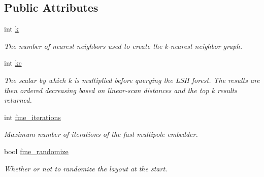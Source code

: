 \subsection*{Public Attributes}
\begin{DoxyCompactItemize}
\item 
\mbox{\label{structtmap_1_1LayoutConfiguration_a80ddc818732d708764fbd83ad7b7d153}} 
int \hyperlink{structtmap_1_1LayoutConfiguration_a80ddc818732d708764fbd83ad7b7d153}{k}
\begin{DoxyCompactList}\small\item\em The number of nearest neighbors used to create the k-\/nearest neighbor graph. \end{DoxyCompactList}\item 
\mbox{\label{structtmap_1_1LayoutConfiguration_ae63c0a1d5956cbdb837f3aff1978f867}} 
int \hyperlink{structtmap_1_1LayoutConfiguration_ae63c0a1d5956cbdb837f3aff1978f867}{kc}
\begin{DoxyCompactList}\small\item\em The scalar by which k is multiplied before querying the L\+SH forest. The results are then ordered decreasing based on linear-\/scan distances and the top k results returned. \end{DoxyCompactList}\item 
\mbox{\label{structtmap_1_1LayoutConfiguration_aa0b26a532aedb8f0fe4490c9c90b0e84}} 
int \hyperlink{structtmap_1_1LayoutConfiguration_aa0b26a532aedb8f0fe4490c9c90b0e84}{fme\+\_\+iterations}
\begin{DoxyCompactList}\small\item\em Maximum number of iterations of the fast multipole embedder. \end{DoxyCompactList}\item 
\mbox{\label{structtmap_1_1LayoutConfiguration_a821bf612fb3063344ca0c6b161424a7b}} 
bool \hyperlink{structtmap_1_1LayoutConfiguration_a821bf612fb3063344ca0c6b161424a7b}{fme\+\_\+randomize}
\begin{DoxyCompactList}\small\item\em Whether or not to randomize the layout at the start. \end{DoxyCompactList}\item 

\end{DoxyCompactItemize}
